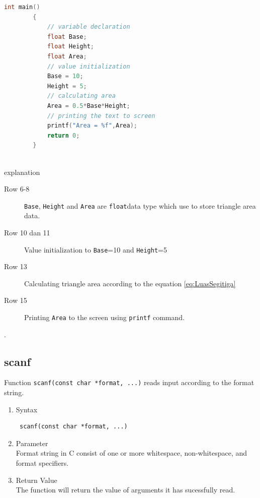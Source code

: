 \begin{description}
\begin{lstlisting}[language=c,captionpos=t]
		int main()
		{
			// variable declaration
			float Base;
			float Height;
			float Area;
			// value initialization
			Base = 10;
			Height = 5;
			// calculating area
			Area = 0.5*Base*Height;
			// printing the text to screen
			printf("Area = %f",Area);
			return 0;
		}
		
	\end{lstlisting}

		explanation
		\begin{description}
			\item[Row 6-8]  \verb|Base|, \verb|Height| and \verb|Area| are \verb|float|data type which use to store triangle area data.
			\item[Row 10 dan 11] Value initialization to \verb|Base|=10 and \verb|Height|=5
			\item[Row 13] Calculating triangle area according to  the equation \ref{eq:LuasSegitiga}
			\item[Row 15] Printing \verb|Area| to the screen using \verb|printf| command.
		\end{description}
\end{description}

.\subsection{scanf}
Function \verb*|scanf(const char *format, ...)| reads input according to the format string.

\begin{enumerate}
	\item Syntax
	      \begin{verbatim} scanf(const char *format, ...)
	\end{verbatim}
	\item Parameter \\
	      Format string in C consist of one or more whitespace, non-whitespace, and format specifiers.
	\item Return Value \\
	      The function will return the value of arguments it has sucessfully read.

\end{enumerate}

